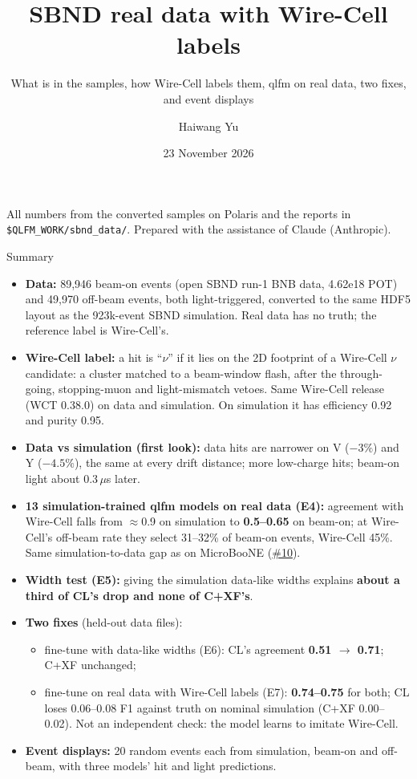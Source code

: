 \documentclass[aspectratio=169,10pt]{beamer}
\title{SBND real data with Wire-Cell labels}
\subtitle{What is in the samples, how Wire-Cell labels them, qlfm on real data, two fixes, and event displays}
\author{Haiwang Yu}
\institute{fm4npp-lartpc \;\textbullet\; issue \iss{14} (data), \iss{11} (simulation)}
\date{23 November 2026}
\newcommand{\code}[1]{\texttt{#1}}
\newcommand{\good}[1]{{\color{green!45!black}\textbf{#1}}}
\newcommand{\bad}[1]{{\color{red!70!black}\textbf{#1}}}
\newcommand{\gh}{https://github.com/HaiwangYu/fm4npp-lartpc}
\newcommand{\iss}[1]{\href{\gh/issues/#1}{\color{blue!60!black}\##1}}
\begin{document}
\begin{frame}
  \titlepage
  \vfill
  {\tiny All numbers from the converted samples on Polaris and the reports in \code{\$QLFM\_WORK/sbnd\_data/}.
  Prepared with the assistance of Claude (Anthropic).}
\end{frame}

\begin{frame}{Summary}
  \scriptsize
  \begin{itemize}\setlength{\itemsep}{3pt}
    \item \textbf{Data:} 89,946 beam-on events (open SBND run-1 BNB data, 4.62e18 POT) and 49,970 off-beam events, both
      light-triggered, converted to the same HDF5 layout as the 923k-event SBND simulation. Real data has no truth; the
      reference label is Wire-Cell's.
    \item \textbf{Wire-Cell label:} a hit is ``$\nu$'' if it lies on the 2D footprint of a Wire-Cell $\nu$ candidate: a
      cluster matched to a beam-window flash, after the through-going, stopping-muon and light-mismatch vetoes. Same
      Wire-Cell release (WCT 0.38.0) on data and simulation. On simulation it has efficiency 0.92 and purity 0.95.
    \item \textbf{Data vs simulation (first look):} data hits are narrower on V ($-3\%$) and Y ($-4.5\%$), the same at
      every drift distance; more low-charge hits; beam-on light about 0.3\,$\mu$s later.
    \item \textbf{13 simulation-trained qlfm models on real data (E4):} agreement with Wire-Cell falls from $\approx$0.9 on
      simulation to \bad{0.5--0.65} on beam-on; at Wire-Cell's off-beam rate they select 31--32\% of beam-on events,
      Wire-Cell 45\%. Same simulation-to-data gap as on MicroBooNE (\iss{10}).
    \item \textbf{Width test (E5):} giving the simulation data-like widths explains \textbf{about a third of CL's drop and none of C+XF's}.
    \item \textbf{Two fixes} (held-out data files):
      \begin{itemize}\scriptsize
        \item fine-tune with data-like widths (E6): CL's agreement \good{0.51 $\to$ 0.71}; C+XF unchanged;
        \item fine-tune on real data with Wire-Cell labels (E7): \good{0.74--0.75} for both; CL loses 0.06--0.08 F1 against
          truth on nominal simulation (C+XF 0.00--0.02). Not an independent check: the model learns to imitate Wire-Cell.
      \end{itemize}
    \item \textbf{Event displays:} 20 random events each from simulation, beam-on and off-beam, with three models' hit and light predictions.
  \end{itemize}
\end{frame}
\end{document}

